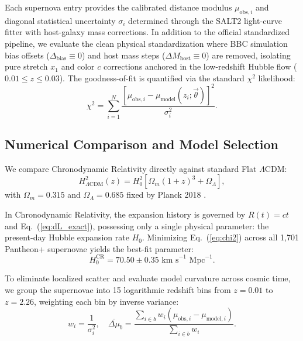 \documentclass[aps,prd,reprint,superscriptaddress,nofootinbib,floatfix,amsmath,amssymb]{revtex4-2}
\begin{document}
Each supernova entry provides the calibrated distance modulus $\mu_{\text{obs}, i}$ and diagonal statistical uncertainty $\sigma_i$ determined through the SALT2 light-curve fitter with host-galaxy mass corrections. In addition to the official standardized pipeline, we evaluate the clean physical standardization where BBC simulation bias offsets ($\Delta_{\text{bias}} \equiv 0$) and host mass steps ($\Delta M_{\text{host}} \equiv 0$) are removed, isolating pure stretch $x_1$ and color $c$ corrections anchored in the low-redshift Hubble flow ($0.01 \le z \le 0.03$). The goodness-of-fit is quantified via the standard $\chi^2$ likelihood:
\begin{equation}
\chi^2 = \sum_{i=1}^{N} \frac{\left[ \mu_{\text{obs}, i} - \mu_{\text{model}}(z_i; \vec{\theta}) \right]^2}{\sigma_i^2}.
\label{eq:chi2}
\end{equation}

\subsection{Numerical Comparison and Model Selection}

We compare Chronodynamic Relativity directly against standard Flat $\Lambda\text{CDM}$:
\begin{equation}
H_{\Lambda\text{CDM}}^2(z) = H_0^2 \left[ \Omega_m (1+z)^3 + \Omega_\Lambda \right],
\end{equation}
with $\Omega_m = 0.315$ and $\Omega_\Lambda = 0.685$ fixed by Planck 2018 \cite{Planck2018_Cosmology}.

In Chronodynamic Relativity, the expansion history is governed by $R(t) = ct$ and Eq.~(\ref{eq:dL_exact}), possessing only a single physical parameter: the present-day Hubble expansion rate $H_0$. Minimizing Eq.~(\ref{eq:chi2}) across all 1,701 Pantheon+ supernovae yields the best-fit parameter:
\begin{equation}
H_0^{\text{CR}} = 70.50 \pm 0.35\text{ km s}^{-1}\text{ Mpc}^{-1}.
\label{eq:h0_cr_fit}
\end{equation}

To eliminate localized scatter and evaluate model curvature across cosmic time, we group the supernovae into 15 logarithmic redshift bins from $z = 0.01$ to $z = 2.26$, weighting each bin by inverse variance:
\begin{equation}
w_i = \frac{1}{\sigma_i^2}, \quad \bar{\Delta\mu}_b = \frac{\sum_{i \in b} w_i (\mu_{\text{obs}, i} - \mu_{\text{model}, i})}{\sum_{i \in b} w_i}.
\end{equation}
\end{document}

